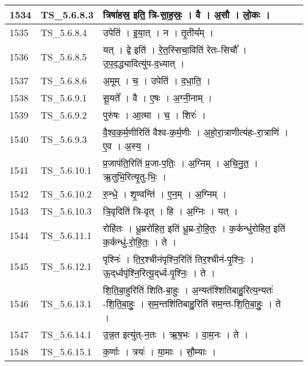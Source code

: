 \documentclass[17pt]{extarticle}
\begin{document}
\begin{longtable}{||p{0.4in}||p{0.9in}||p{4.0in}||p{0.9in}||}
        \hline
            1534 & TS\_5.6.8.3 & त्रिषा॑हस्र॒ इति॒ त्रि{-}सा॒ह॒स्रः॒   ।   वै   ।   अ॒सौ   ।   लो॒कः   ।    &      \\
        \hline
            1535 & TS\_5.6.8.4 & उपेति॑   ।   इ॒या॒त्   ।   न   ।   तृ॒तीय᳚म्   ।    &      \\
        \hline
            1536 & TS\_5.6.8.5 & यत्   ।   द्वे इति॑   ।   रे॒त॒स्सिचा॒विति॑ रेतः{-}सिचौ᳚   ।   उ॒प॒द॒द्ध्यादित्यु॑प{-}द॒ध्यात्   ।    &      \\
        \hline
            1537 & TS\_5.6.8.6 & अ॒मूम्   ।   च॒   ।   उपेति॑   ।   द॒धा॒ति॒   ।    &      \\
        \hline
            1538 & TS\_5.6.9.1 & सू॒यते᳚   ।   वै   ।   ए॒षः   ।   अ॒ग्नी॒नाम्   ।    &      \\
        \hline
            1539 & TS\_5.6.9.2 & पुरु॑षः   ।   आ॒त्मा   ।   च॒   ।   शिरः॑   ।    &      \\
        \hline
            1540 & TS\_5.6.9.3 & वै॒श्व॒क॒र्म॒णीरिति॑ वैश्व{-}क॒र्म॒णीः   ।   अ॒हो॒रा॒त्राणीत्य॑हः{-}रा॒त्राणि॑   ।   ए॒व   ।   अ॒स्य॒   ।    &      \\
        \hline
            1541 & TS\_5.6.10.1 & प्र॒जाप॑ति॒रिति॑ प्र॒जा{-}प॒तिः॒   ।   अ॒ग्निम्   ।   अ॒चि॒नु॒त॒   ।   ऋ॒तुभि॒रित्यृ॒तु{-}भिः॒   ।    &      \\
        \hline
            1542 & TS\_5.6.10.2 & रु॒न्धे॒   ।   शृ॒ण्वन्ति॑   ।   ए॒न॒म्   ।   अ॒ग्निम्   ।    &      \\
        \hline
            1543 & TS\_5.6.10.3 & त्रि॒वृदिति॑ त्रि{-}वृत्   ।   हि   ।   अ॒ग्निः   ।   यत्   ।    &      \\
        \hline
            1544 & TS\_5.6.11.1 & रोहि॑तः   ।   धू॒म्ररो॑हित॒ इति॑ धू॒म्र{-}रो॒हि॒तः॒   ।   क॒र्कन्धु॑रोहित॒ इति॑ क॒र्कन्धु॑{-}रो॒हि॒तः॒   ।   ते   ।    &      \\
        \hline
            1545 & TS\_5.6.12.1 & पृश्निः॑   ।   ति॒र॒श्चीन॑पृश्नि॒रिति॑ तिर॒श्चीन॑{-}पृ॒श्निः॒   ।   ऊ॒द्‌र्ध्वपृ॑श्नि॒रित्यू॒द्‌र्ध्व{-}पृ॒श्निः॒   ।   ते   ।    &      \\
        \hline
            1546 & TS\_5.6.13.1 & शि॒ति॒बा॒हुरिति॑ शिति{-}बा॒हुः   ।   अ॒न्यत॑श्शितिबाहु॒रित्य॒न्यतः॑ {-}शि॒ति॒बा॒हुः॒   ।   स॒म॒न्तशि॑तिबाहु॒रिति॑ सम॒न्त{-}शि॒ति॒बा॒हुः॒   ।   ते   ।    &      \\
        \hline
            1547 & TS\_5.6.14.1 & उ॒न्न॒त इत्यु॑त्{-}न॒तः   ।   ऋ॒ष॒भः   ।   वा॒म॒नः   ।   ते   ।    &      \\
        \hline
            1548 & TS\_5.6.15.1 & क॒र्णाः   ।   त्रयः॑   ।   या॒माः   ।   सौ॒म्याः   ।    &      \\

\end{longtable}
\end{document}
